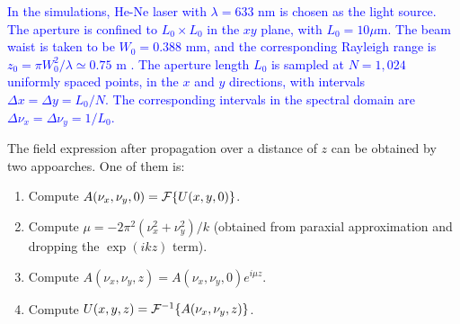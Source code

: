 
\textcolor{blue}{In the simulations, He-Ne laser with $\lambda = 633$ nm is chosen as the light source.
The aperture is confined to $L_0 \times L_0$ in the $xy$ plane, with $L_0 = 10 \mu$m.
The beam waist is taken to be $W_0 = 0.388$ mm, and the corresponding Rayleigh range is $z_0 = \pi W_0^2/ \lambda \simeq 0.75$ m \cite{FSM05}.
The aperture length $L_0$ is sampled at $N = 1,024$ uniformly spaced points, in the $x$ and $y$ directions, 
with intervals $\Delta x = \Delta y = L_0 / N$.
The corresponding intervals in the spectral domain are $\Delta \nu_x = \Delta \nu_y = 1 / L_0$.}

The field expression after propagation over a distance of $z$ can be obtained by two appoarches. One of them is:
\begin{enumerate}
	\item Compute $A(\nu_x, \nu_y, 0) = {\cal F} \{ U(x, y, 0) \}$.
	\item Compute $\mu = -2 \pi^2 (\nu_x^2 + \nu_y^2) / k$ (obtained from paraxial approximation and dropping the $\exp(ikz)$ term).
	\item Compute $A(\nu_x, \nu_y, z) = A(\nu_x, \nu_y, 0) e^{i \mu z}$.
	\item Compute $U(x, y, z) = {\cal F}^{-1} \{A(\nu_x, \nu_y, z)\}$.
\end{enumerate}


